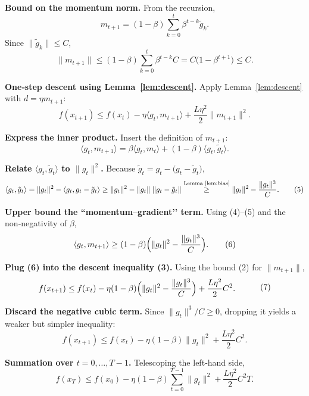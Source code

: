 \documentclass{article}
\newcommand{\ip}[2]{\langle #1,#2\rangle}
\begin{document}
\begin{enumerate}[label={[\textbf{Step \arabic*}]},leftmargin=*]
\item \textbf{Bound on the momentum norm.}  
From the recursion,
\[
m_{t+1}= (1-\beta)\sum_{k=0}^{t}\beta^{t-k}\tilde g_{k}.
\]
Since $\|\tilde g_{k}\|\le C$,
\[
\|m_{t+1}\|\le (1-\beta)\sum_{k=0}^{t}\beta^{t-k}C
           = C\bigl(1-\beta^{t+1}\bigr)\le C.
\tag{2}
\]

\item \textbf{One‑step descent using Lemma~\ref{lem:descent}.}  
Apply Lemma~\ref{lem:descent} with $d=\eta m_{t+1}$:
\[
f(x_{t+1})\le f(x_{t})-\eta\ip{g_{t}}{m_{t+1}}
            +\frac{L\eta^{2}}{2}\|m_{t+1}\|^{2}.
\tag{3}
\]

\item \textbf{Express the inner product.}  
Insert the definition of $m_{t+1}$:
\[
\ip{g_{t}}{m_{t+1}}
 =\beta\ip{g_{t}}{m_{t}}+(1-\beta)\ip{g_{t}}{\tilde g_{t}}.
\tag{4}
\]

\item \textbf{Relate $\ip{g_{t}}{\tilde g_{t}}$ to $\|g_{t}\|^{2}$.}  
Because $\tilde g_{t}=g_{t}-\bigl(g_{t}-\tilde g_{t}\bigr)$,
\[
\ip{g_{t}}{\tilde g_{t}}
 =\|g_{t}\|^{2}-\ip{g_{t}}{g_{t}-\tilde g_{t}}
 \ge \|g_{t}\|^{2}-\|g_{t}\|\;\|g_{t}-\tilde g_{t}\|
 \overset{\text{Lemma~\ref{lem:bias}}}{\ge}
 \|g_{t}\|^{2}-\frac{\|g_{t}\|^{3}}{C}.
\tag{5}
\]

\item \textbf{Upper bound the ``momentum–gradient’’ term.}  
Using (4)–(5) and the non‑negativity of $\beta$,
\[
\ip{g_{t}}{m_{t+1}}
 \ge (1-\beta)\Bigl(\|g_{t}\|^{2}-\frac{\|g_{t}\|^{3}}{C}\Bigr).
\tag{6}
\]

\item \textbf{Plug (6) into the descent inequality (3).}  
Using the bound (2) for $\|m_{t+1}\|$,
\[
\begin{aligned}
f(x_{t+1})
 &\le f(x_{t})-\eta(1-\beta)\Bigl(\|g_{t}\|^{2}
      -\frac{\|g_{t}\|^{3}}{C}\Bigr)
      +\frac{L\eta^{2}}{2}C^{2}.
\end{aligned}
\tag{7}
\]

\item \textbf{Discard the negative cubic term.}  
Since $\|g_{t}\|^{3}/C\ge0$, dropping it yields a weaker but simpler inequality:
\[
f(x_{t+1})\le f(x_{t})-\eta(1-\beta)\|g_{t}\|^{2}
          +\frac{L\eta^{2}}{2}C^{2}.
\tag{8}
\]

\item \textbf{Summation over $t=0,\dots,T-1$.}  
Telescoping the left‑hand side,
\[
f(x_{T})\le f(x_{0})-\eta(1-\beta)\sum_{t=0}^{T-1}\|g_{t}\|^{2}
          +\frac{L\eta^{2}}{2}C^{2}T.
\tag{9}
\]


\end{enumerate}
\end{document}
